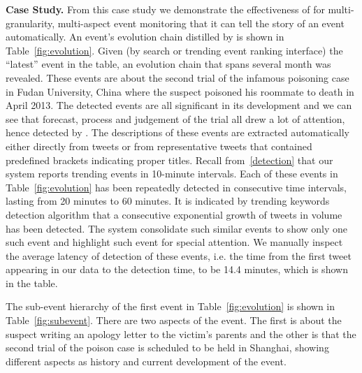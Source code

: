 
\noindent\textbf{Case Study.}
\label{casestudy}
From this case study we demonstrate the effectiveness of \ring for multi-granularity, multi-aspect event monitoring that it can tell the story of an event automatically.
An event's evolution chain distilled by \ring is shown in Table~\ref{fig:evolution}.
Given (by search or trending event ranking interface) the ``latest'' event in the table, an evolution chain that spans several month was revealed.
These events are about the second trial of the infamous poisoning case in Fudan University, China
where the suspect poisoned his roommate to death in April 2013.
The detected events are all significant in its development and we can see that forecast, process and judgement of the trial all drew a lot of attention, hence detected by \ring.
The descriptions of these events are extracted automatically either directly from tweets or from representative tweets that contained predefined brackets indicating proper titles.
Recall from~\ref{detection} that our system reports trending events in 10-minute intervals.
Each of these events in Table~\ref{fig:evolution} has been repeatedly detected in consecutive time intervals, lasting from 20 minutes to 60 minutes.
It is indicated by trending keywords detection algorithm that a consecutive exponential growth of tweets in volume has been detected.
The system consolidate such similar events to show only one such event and highlight such event for special attention.
We manually inspect the average latency of detection of these events, i.e. the time from the first tweet appearing in our data to the detection time, to be 14.4 minutes, which is shown in the table.

The sub-event hierarchy of the first event in Table~\ref{fig:evolution} is shown in Table~\ref{fig:subevent}.
There are two aspects of the event.
The first is about the suspect writing an apology letter to the victim's parents and the other is that the second trial of the poison case is scheduled to be held in Shanghai, showing different aspects as history and current development of the event.

